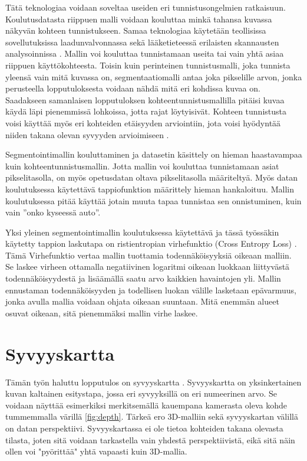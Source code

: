 Tätä teknologiaa voidaan soveltaa useiden eri tunnistusongelmien ratkaisuun.
Koulutusdatasta riippuen malli voidaan kouluttaa minkä tahansa kuvassa näkyvän kohteen tunnistukseen.
Samaa teknologiaa käytetään teollisissa sovellutuksissa laadunvalvonnassa
sekä lääketieteessä erilaisten skannausten analysoinnissa \cite{NagalakshmiT2022BCSS}.
Mallin voi kouluttaa tunnistamaan useita tai vain yhtä asiaa riippuen käyttökohteesta.
Toisin kuin perinteinen tunnistusmalli, joka tunnista yleensä vain mitä kuvassa on,
segmentaatiomalli antaa joka pikselille arvon, jonka perusteella lopputuloksesta voidaan nähdä mitä eri kohdissa kuvaa on.
Saadakseen samanlaisen lopputuloksen kohteentunnistusmallilla pitäisi kuvaa käydä läpi pienemmissä lohkoissa, jotta rajat löytyisivät.
Kohteen tunnistusta voisi käyttää myös eri kohteiden etäisyyden arviointiin, jota voisi hyödyntää niiden takana olevan syvyyden arvioimiseen \cite{ShiZhou2023VRBo}.

Segmentointimallin kouluttaminen ja datasetin käsittely on hieman haastavampaa kuin kohteentunnistusmallin.
Jotta mallin voi kouluttaa tunnistamaan asiat pikselitasolla, on myös opetusdatan oltava pikselitasolla määriteltyä. 
Myös datan koulutuksessa käytettävä tappiofunktion määrittely hieman hankaloituu.
Mallin koulutuksessa pitää käyttää jotain muuta tapaa tunnistaa sen onnistuminen, kuin vain ”onko kyseessä auto”.

Yksi yleinen segmentointimallin koulutuksessa käytettävä ja tässä työssäkin käytetty tappion laskutapa 
on ristientropian virhefunktio (Cross Entropy Loss) \cite{CrossEntropyLoss}.
Tämä Virhefunktio vertaa mallin tuottamia todennäköisyyksiä oikeaan malliin. 
Se laskee virheen ottamalla negatiivinen logaritmi oikeaan luokkaan liittyvästä todennäköisyydestä ja lisäämällä saatu arvo kaikkien havaintojen yli.
Mallin ennustaman todennäköisyyden ja todellisen luokan välille lasketaan epävarmuus, jonka avulla mallia voidaan ohjata oikeaan suuntaan.
Mitä enemmän alueet osuvat oikeaan, sitä pienemmäksi mallin virhe laskee.

\section{Syvyyskartta}

Tämän työn haluttu lopputulos on syvyyskartta \cite{IkeuchiKatsushi1987DaDM}.  
Syvyyskartta on yksinkertainen kuvan kaltainen esitystapa, jossa eri syvyyksillä on eri numeerinen arvo.  
Se voidaan näyttää esimerkiksi merkitsemällä kauempana kamerasta oleva kohde tummemmalla värillä \ref{fig:depth}.  
Tärkeä ero 3D-malliin sekä syvyyskartan välillä on datan perspektiivi.  
Syvyyskartassa ei ole tietoa kohteiden takana olevasta tilasta, joten sitä voidaan tarkastella vain yhdestä perspektiivistä, eikä sitä näin ollen voi "pyörittää" yhtä vapaasti kuin 3D-mallia.  

